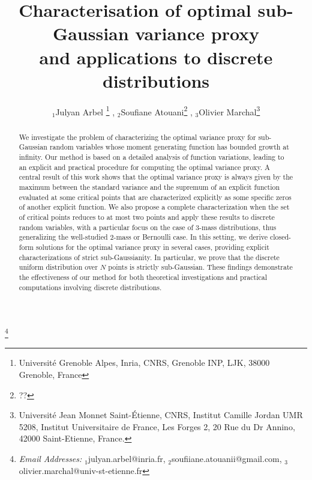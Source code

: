 \documentclass[a4paper, 10pt]{article}
\author{$_{1}$Julyan Arbel \footnote{Universit\'{e} Grenoble Alpes, Inria, CNRS, Grenoble INP, LJK, 38000 Grenoble, France}\,\,,
$_{2}$Soufiane Atouani\footnote{??}\,\,,
$_{3}$Olivier Marchal\footnote{Universit\'{e} Jean Monnet Saint-\'{E}tienne, CNRS, Institut Camille Jordan UMR 5208, Institut Universitaire de France, Les Forges 2, 20 Rue du Dr Annino, 42000 Saint-Etienne, France.}
}
\title{Characterisation of optimal sub-Gaussian variance proxy\\ and applications to discrete distributions}
\date{}
\renewcommand{\thefootnote}{\fnsymbol{footnote}}
\theoremstyle{definition}
\newcommand\blfootnote[1]{%
  \begingroup
  \renewcommand\thefootnote{}\footnote{#1}%
  \addtocounter{footnote}{-1}%
  \endgroup
}
\begin{document}
\maketitle

\blfootnote{\textit{Email Addresses:}
$_{1}$\textsf{julyan.arbel@inria.fr},
$_{2}$\textsf{soufiiane.atouanii@gmail.com},
$_{3}$\textsf{olivier.marchal@univ-st-etienne.fr}}

\begin{abstract}
We investigate the problem of characterizing the optimal variance proxy for sub-Gaussian random variables whose moment generating function has bounded growth at infinity. Our method is based on a detailed analysis of function variations, leading  to an explicit and practical procedure for computing the optimal variance proxy. A central result of this work shows that the optimal variance proxy is always given by the maximum between the standard variance and the supremum of an explicit function evaluated at some critical points that are characterized explicitly as some specific zeros of another explicit function. We also propose a complete characterization when the set of critical points reduces to at most two points and apply these results to discrete random variables, with a particular focus on the case of 3-mass distributions, thus generalizing the well-studied 2-mass or Bernoulli case. In this setting, we derive closed-form solutions for the optimal variance proxy in several cases, providing explicit characterizations of strict sub-Gaussianity. In particular, we prove that the discrete uniform distribution over $N$ points is strictly sub-Gaussian. These findings demonstrate the effectiveness of our method for both theoretical investigations and practical computations involving discrete distributions.
\end{abstract}

\tableofcontents

\newpage
\end{document}
